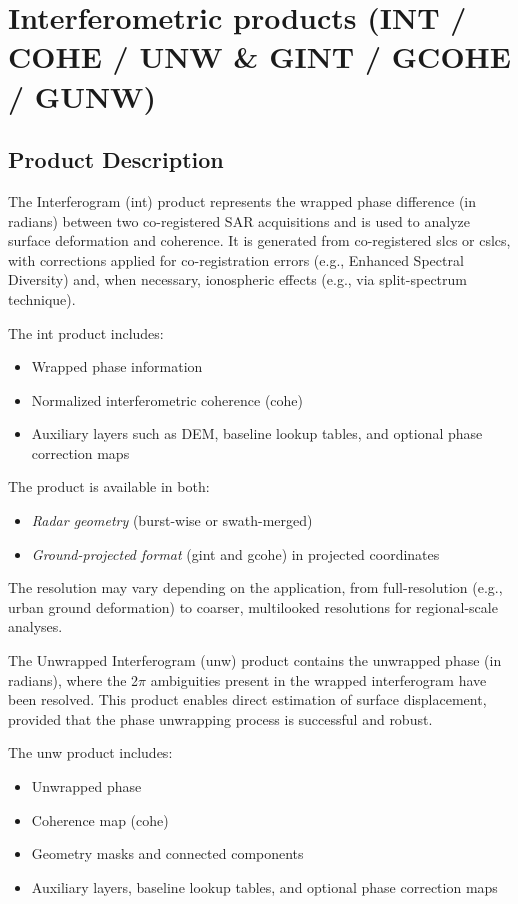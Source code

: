 \section{Interferometric products (INT / COHE / UNW \& GINT / GCOHE / GUNW)}

\subsection{Product Description}
The Interferogram (\acs{int}) product represents the wrapped phase difference (in radians) between two co-registered SAR acquisitions and is used to analyze surface deformation and coherence. It is generated from co-registered \acs{slc}s or \acs{cslc}s, with corrections applied for co-registration errors (e.g., Enhanced Spectral Diversity) and, when necessary, ionospheric effects (e.g., via split-spectrum technique).

The \acs{int} product includes:
\begin{itemize}
    \item Wrapped phase information
    \item Normalized interferometric coherence (\acs{cohe})
    \item Auxiliary layers such as DEM, baseline lookup tables, and optional phase correction maps
\end{itemize}

The product is available in both:
\begin{itemize}
    \item \textit{Radar geometry} (burst-wise or swath-merged)
    \item \textit{Ground-projected format} (\acs{gint} and \acs{gcohe}) in projected coordinates
\end{itemize}

The resolution may vary depending on the application, from full-resolution (e.g., urban ground deformation) to coarser, multilooked resolutions for regional-scale analyses.

The Unwrapped Interferogram (\acs{unw}) product contains the unwrapped phase (in radians), where the 2$\pi$ ambiguities present in the wrapped interferogram have been resolved. This product enables direct estimation of surface displacement, provided that the phase unwrapping process is successful and robust.

The \acs{unw} product includes:
\begin{itemize}
    \item Unwrapped phase
    \item Coherence map (\acs{cohe})
    \item Geometry masks and connected components
    \item Auxiliary layers, baseline lookup tables, and optional phase correction maps
\end{itemize}

